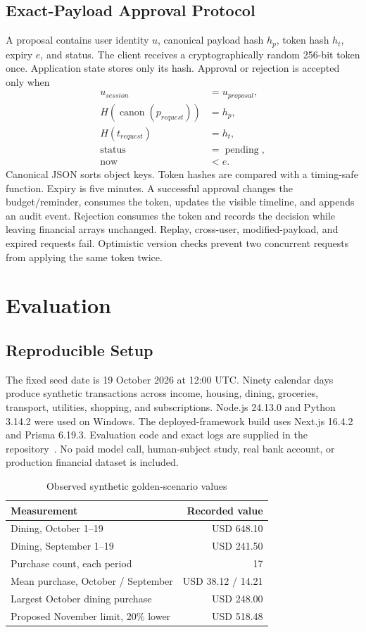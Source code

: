 \documentclass[conference,a4paper]{IEEEtran}
\begin{document}
\subsection{Exact-Payload Approval Protocol}
A proposal contains user identity $u$, canonical payload hash $h_p$, token hash $h_t$, expiry $e$, and status. The client receives a cryptographically random 256-bit token once. Application state stores only its hash. Approval or rejection is accepted only when
\begin{align}
u_{session}&=u_{proposal},\\
H(\operatorname{canon}(p_{request}))&=h_p,\\
H(t_{request})&=h_t,\\
\operatorname{status}&=\operatorname{pending},\\
\operatorname{now}&<e.
\end{align}
Canonical JSON sorts object keys. Token hashes are compared with a timing-safe function. Expiry is five minutes. A successful approval changes the budget/reminder, consumes the token, updates the visible timeline, and appends an audit event. Rejection consumes the token and records the decision while leaving financial arrays unchanged. Replay, cross-user, modified-payload, and expired requests fail. Optimistic version checks prevent two concurrent requests from applying the same token twice.

\section{Evaluation}
\subsection{Reproducible Setup}
The fixed seed date is 19 October 2026 at 12:00 UTC. Ninety calendar days produce \RecordedTransactions{} synthetic transactions across income, housing, dining, groceries, transport, utilities, shopping, and subscriptions. Node.js 24.13.0 and Python 3.14.2 were used on Windows. The deployed-framework build uses Next.js 16.4.2 and Prisma 6.19.3. Evaluation code and exact logs are supplied in the repository~\cite{repo}. No paid model call, human-subject study, real bank account, or production financial dataset is included.

\begin{table}[t]
\caption{Observed synthetic golden-scenario values}
\label{tab:golden}
\centering\small
\begin{tabular}{L{51mm}r}
\toprule Measurement & Recorded value\\\midrule
Dining, October 1--19 & USD 648.10\\
Dining, September 1--19 & USD 241.50\\
Purchase count, each period & 17\\
Mean purchase, October / September & USD 38.12 / 14.21\\
Largest October dining purchase & USD 248.00\\
Proposed November limit, 20\% lower & USD 518.48\\
\bottomrule
\end{tabular}
\end{table}
\end{document}
